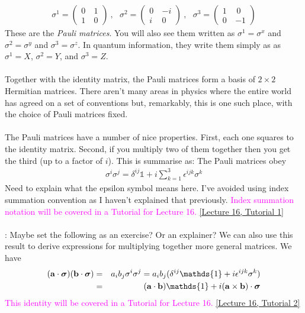 \documentclass[12pt]{article}
\def\be{\begin{eqnarray}}
\def\ee{\end{eqnarray}}
\newcommand{\nn}{\nonumber}
\newcommand\para{\paragraph{}}
\newcommand\bsigma{\mbox{\boldmath $\sigma$}}
\newcommand{\co}{\color{olive}}
\newcommand{\cblue}{\color{blue}}
\newcommand{\alyssa}{\textcolor{magenta}}
\begin{document}
{{%
\be \sigma^1 = \left(\begin{array}{cc} 0 \ & 1 \\ 1 \ & 0\end{array}\right)\  ,\ \ \ \sigma^2 = \left(\begin{array}{cc} 0 \ & -i \\ i \ & 0\end{array}\right)\  ,\ \ \ \sigma^3 = \left(\begin{array}{cc} 1 \, &\, 0 \\ 0 \ & -1\end{array}\right)\nn\ee
%
These are the {\it Pauli matrices}. You will also see them written as $\sigma^1=\sigma^x$ and $\sigma^2=\sigma^y$ and $\sigma^3=\sigma^z$. In quantum information, they write them simply as  as $\sigma^1=X$, $\sigma^2=Y$, and $\sigma^3=Z$.}

\para
Together with the identity matrix, the Pauli matrices form a basis of $2\times 2$ Hermitian matrices. There aren't many areas in physics where the entire world has agreed on a set of conventions but, remarkably, this is one such place, with the choice of Pauli matrices fixed.

\para
The Pauli matrices have a number of nice properties. First, each one squares to the identity matrix. Second, if you multiply two of them together then you get the third (up to a factor of $i$).  This is summarise as: {\co The Pauli matrices obey
%
\be \sigma^i \sigma^j = \delta^{ij}\mathds{1} + i\sum_{k=1}^3\epsilon^{ijk} \sigma^k\nn\ee
%
} {\cblue Need to explain what the epsilon symbol means here. I've avoided using index summation convention as I haven't explained that previously.} \alyssa{Index summation notation will be covered in a Tutorial for Lecture 16.} \href{https://drive.google.com/file/d/16p6tLVzgNswnyzVavrRlcRbfSWl1785W/view?usp=drive_link}{[Lecture 16, Tutorial 1]}


\para
{\cblue: Maybe set the following as an exercise? Or an explainer? We can also use this result to derive expressions for multiplying together more general matrices. We have
%
\be ({\bf a}\cdot \bsigma) ({\bf b}\cdot \bsigma)   &=& a_ib_j\sigma^i\sigma^j = a_ib_j(\delta^{ij}\mathds{1} + i\epsilon^{ijk}\sigma^k)\nn\\ &=& ({\bf a}\cdot{\bf b})\mathds{1} + i({\bf a}\times {\bf b})\cdot \bsigma\nn\ee
%
\alyssa{This identity will be covered in a Tutorial for Lecture 16.} \href{https://drive.google.com/file/d/1REZQEEen-HQYo7odgWdHPsDsUAqUlPBS/view?usp=drive_link}{[Lecture 16, Tutorial 2]}
}

}
\end{document}
